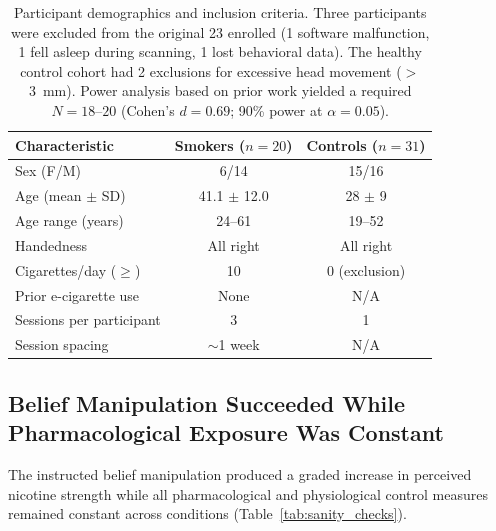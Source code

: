 \documentclass[11pt]{article}
\begin{document}
\begin{table}[H]
\centering
\caption{Participant demographics and inclusion criteria. Three participants were excluded from the original 23 enrolled (1 software malfunction, 1 fell asleep during scanning, 1 lost behavioral data). The healthy control cohort had 2 exclusions for excessive head movement ($>$3~mm). Power analysis based on prior work \citep{gu2015} yielded a required $N = 18$--$20$ (Cohen's $d = 0.69$; 90\% power at $\alpha = 0.05$).}
\label{tab:participants}
\begin{tabular}{lcc}
\toprule
\textbf{Characteristic} & \textbf{Smokers ($n=20$)} & \textbf{Controls ($n=31$)} \\
\midrule
Sex (F/M) & 6/14 & 15/16 \\
Age (mean $\pm$ SD) & 41.1 $\pm$ 12.0 & 28 $\pm$ 9 \\
Age range (years) & 24--61 & 19--52 \\
Handedness & All right & All right \\
Cigarettes/day ($\geq$) & 10 & 0 (exclusion) \\
Prior e-cigarette use & None & N/A \\
Sessions per participant & 3 & 1 \\
Session spacing & $\sim$1 week & N/A \\
\bottomrule
\end{tabular}
\end{table}

\subsection{Belief Manipulation Succeeded While Pharmacological Exposure Was Constant}

The instructed belief manipulation produced a graded increase in perceived nicotine strength while all pharmacological and physiological control measures remained constant across conditions (Table~\ref{tab:sanity_checks}).
\end{document}
